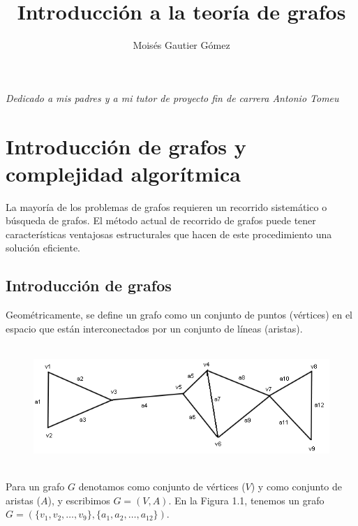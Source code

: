 \documentclass[10pt,a5paper]{book}
\title{Introducción a la teoría de grafos}
\author{Moisés Gautier Gómez}
\date{}
\begin{document}
\renewcommand{\tablename}{Tabla}
\renewcommand{\listtablename}{Índice de Tablas}

\frontmatter
\maketitle
\chapter*{}

\emph{Dedicado a mis padres y a mi tutor de proyecto fin de carrera Antonio Tomeu}

\clearpage

\tableofcontents
\listoftables
\listoffigures
\mainmatter
\chapter[Intro. grafos y complej. Algorítmica]{Introducción de grafos y complejidad algorítmica}
La mayoría de los problemas de grafos requieren un recorrido sistemático o búsqueda de grafos. El método actual de recorrido de grafos puede tener características ventajosas estructurales que hacen de este procedimiento una solución eficiente.
\section{Introducción de grafos}

Geométricamente, se define un grafo como un conjunto de puntos (vértices) en el espacio que están interconectados por un conjunto de líneas (aristas).\newline

\begin{figure}[H]
  \centering
  \caption{ }
  \hrulefill{}\\
  \includegraphics[scale=0.4]{Figura1_1.png}
\end{figure}

\hrulefill{}\\
Para un grafo $G$ denotamos como conjunto de vértices ({$V$}) y como conjunto de aristas ($A$), y escribimos $G = (V, A)$. En la Figura 1.1, tenemos un grafo $G = (\{v_1,v_2, \ldots,v_9\}, \{a_1,a_2, \ldots,a_{12}\})$.
\end{document}
